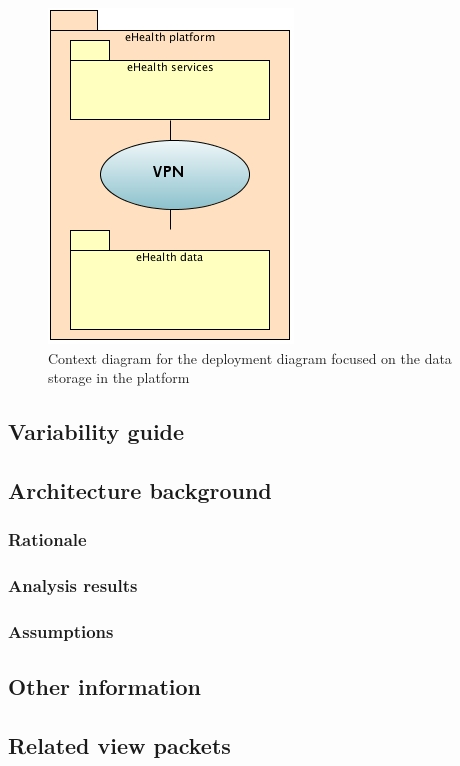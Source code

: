 \documentclass[a4paper,10pt]{article}
\begin{document}
\begin{figure}[!h]
  \includegraphics[scale=0.75]{../images/deployment_data_context.jpg}
    \caption{Context diagram for the deployment diagram focused on the data storage in the platform}
\end{figure}

\subsection{Variability guide}

\subsection{Architecture background}

\subsubsection{Rationale}

\subsubsection{Analysis results}

\subsubsection{Assumptions}

\subsection{Other information}

\subsection{Related view packets}
\end{document}
